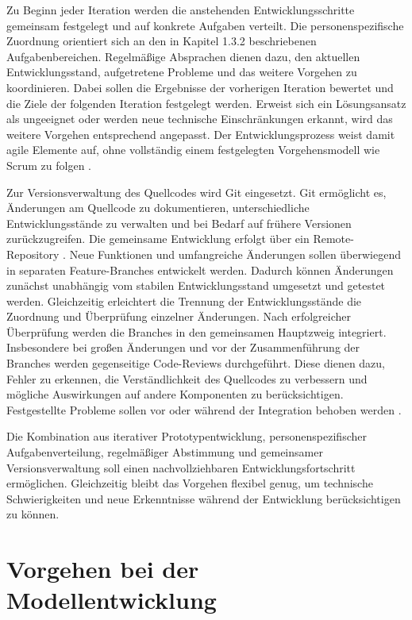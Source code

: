 Zu Beginn jeder Iteration werden die anstehenden Entwicklungsschritte gemeinsam festgelegt und auf konkrete Aufgaben verteilt. Die personenspezifische Zuordnung orientiert sich an den in Kapitel 1.3.2 beschriebenen Aufgabenbereichen. Regelmäßige Absprachen dienen dazu, den aktuellen Entwicklungsstand, aufgetretene Probleme und das weitere Vorgehen zu koordinieren. Dabei sollen die Ergebnisse der vorherigen Iteration bewertet und die Ziele der folgenden Iteration festgelegt werden. Erweist sich ein Lösungsansatz als ungeeignet oder werden neue technische Einschränkungen erkannt, wird das weitere Vorgehen entsprechend angepasst. Der Entwicklungsprozess weist damit agile Elemente auf, ohne vollständig einem festgelegten Vorgehensmodell wie Scrum zu folgen \cite{ManifestoAgileSoftware}.

Zur Versionsverwaltung des Quellcodes wird Git eingesetzt. Git ermöglicht es, Änderungen am Quellcode zu dokumentieren, unterschiedliche Entwicklungsstände zu verwalten und bei Bedarf auf frühere Versionen zurückzugreifen. Die gemeinsame Entwicklung erfolgt über ein Remote-Repository \cite[S. 27ff.]{preisselGitDezentraleVersionsverwaltung2019}. Neue Funktionen und umfangreiche Änderungen sollen überwiegend in separaten Feature-Branches entwickelt werden.  Dadurch können Änderungen zunächst unabhängig vom stabilen Entwicklungsstand umgesetzt und getestet werden. Gleichzeitig erleichtert die Trennung der Entwicklungsstände die Zuordnung und Überprüfung einzelner Änderungen. Nach erfolgreicher Überprüfung werden die Branches in den gemeinsamen Hauptzweig integriert. Insbesondere bei großen Änderungen und vor der Zusammenführung der Branches werden gegenseitige Code-Reviews durchgeführt. Diese dienen dazu, Fehler zu erkennen, die Verständlichkeit des Quellcodes zu verbessern und mögliche Auswirkungen auf andere Komponenten zu berücksichtigen. Festgestellte Probleme sollen vor oder während der Integration behoben werden \cite[S. 191ff.]{preisselGitDezentraleVersionsverwaltung2019}.

Die Kombination aus iterativer Prototypentwicklung, personenspezifischer Aufgabenverteilung, regelmäßiger Abstimmung und gemeinsamer Versionsverwaltung soll einen nachvollziehbaren Entwicklungsfortschritt ermöglichen. Gleichzeitig bleibt das Vorgehen flexibel genug, um technische Schwierigkeiten und neue Erkenntnisse während der Entwicklung berücksichtigen zu können.

\section{Vorgehen bei der Modellentwicklung}\label{sec:modellentwicklung}


